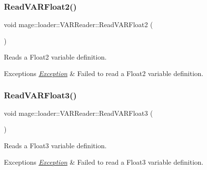\subsubsection{\texorpdfstring{Read\+V\+A\+R\+Float2()}{ReadVARFloat2()}}
{\footnotesize\ttfamily void mage\+::loader\+::\+V\+A\+R\+Reader\+::\+Read\+V\+A\+R\+Float2 (\begin{DoxyParamCaption}{ }\end{DoxyParamCaption})\hspace{0.3cm}{\ttfamily [private]}}

Reads a Float2 variable definition.


\begin{DoxyExceptions}{Exceptions}
{\em \hyperlink{classmage_1_1_exception}{Exception}} & Failed to read a Float2 variable definition. \\
\hline
\end{DoxyExceptions}
\hypertarget{classmage_1_1loader_1_1_v_a_r_reader_a133ffd4462be737377c0cdb921a90e75}{}\label{classmage_1_1loader_1_1_v_a_r_reader_a133ffd4462be737377c0cdb921a90e75} 
\subsubsection{\texorpdfstring{Read\+V\+A\+R\+Float3()}{ReadVARFloat3()}}
{\footnotesize\ttfamily void mage\+::loader\+::\+V\+A\+R\+Reader\+::\+Read\+V\+A\+R\+Float3 (\begin{DoxyParamCaption}{ }\end{DoxyParamCaption})\hspace{0.3cm}{\ttfamily [private]}}

Reads a Float3 variable definition.


\begin{DoxyExceptions}{Exceptions}
{\em \hyperlink{classmage_1_1_exception}{Exception}} & Failed to read a Float3 variable definition. \\
\hline
\end{DoxyExceptions}
\hypertarget{classmage_1_1loader_1_1_v_a_r_reader_a70dfe7e7e0b2fb9a79b6ff4342cc58dc}{}\label{classmage_1_1loader_1_1_v_a_r_reader_a70dfe7e7e0b2fb9a79b6ff4342cc58dc} 
